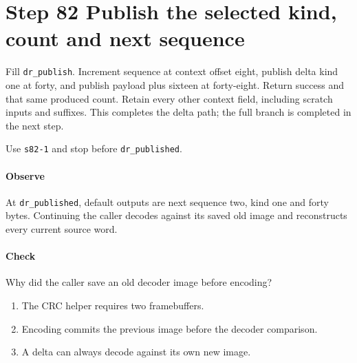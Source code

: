 \section{Step 82 Publish the selected kind, count and next sequence}
Fill \texttt{dr\_publish}. Increment sequence at context offset eight, publish delta kind one at forty, and publish payload plus sixteen at forty-eight. Return success and that same produced count. Retain every other context field, including scratch inputs and suffixes. This completes the delta path; the full branch is completed in the next step.

Use \texttt{s82-1} and stop before \texttt{dr\_published}.

\paragraph{Observe} At \texttt{dr\_published}, default outputs are next sequence two, kind one and forty bytes. Continuing the caller decodes against its saved old image and reconstructs every current source word.

\paragraph{Check} Why did the caller save an old decoder image before encoding?
\begin{enumerate}[label=\Alph*.]
\item The CRC helper requires two framebuffers.
\item Encoding commits the previous image before the decoder comparison.
\item A delta can always decode against its own new image.
\end{enumerate}
